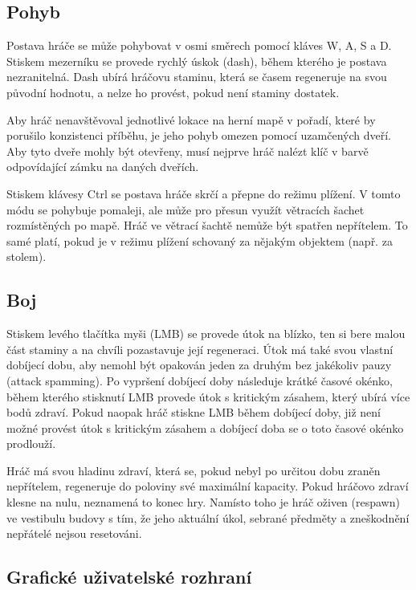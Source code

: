 \documentclass[FM,Proj]{tulthesis}
\begin{document}
	\subsection{Pohyb} %
	
	Postava hráče se může pohybovat v osmi směrech pomocí kláves W, A, S a D. Stiskem mezerníku se provede rychlý úskok (dash), během kterého je postava nezranitelná. Dash ubírá hráčovu staminu, která se časem regeneruje na svou původní hodnotu, a nelze ho provést, pokud není staminy dostatek.
	
	Aby hráč nenavštěvoval jednotlivé lokace na herní mapě v pořadí, které by porušilo konzistenci příběhu, je jeho pohyb omezen pomocí uzamčených dveří. Aby tyto dveře mohly být otevřeny, musí nejprve hráč nalézt klíč v barvě odpovídající zámku na daných dveřích.
	
	Stiskem klávesy Ctrl se postava hráče skrčí a přepne do režimu plížení. V tomto módu se pohybuje pomaleji, ale může pro přesun využít větracích šachet rozmístěných po mapě. Hráč ve větrací šachtě nemůže být spatřen nepřítelem. To samé platí, pokud je v režimu plížení schovaný za nějakým objektem (např. za stolem).
	
	\subsection{Boj} %
	
	Stiskem levého tlačítka myši (LMB) se provede útok na blízko, ten si bere malou část staminy a na chvíli pozastavuje její regeneraci. Útok má také svou vlastní dobíjecí dobu, aby nemohl být opakován jeden za druhým bez jakékoliv pauzy (attack spamming). Po vypršení dobíjecí doby následuje krátké časové okénko, během kterého stisknutí LMB provede útok s kritickým zásahem, který ubírá více bodů zdraví. Pokud naopak hráč stiskne LMB během dobíjecí doby, již není možné provést útok s kritickým zásahem a dobíjecí doba se o toto časové okénko prodlouží.
	
	Hráč má svou hladinu zdraví, která se, pokud nebyl po určitou dobu zraněn nepřítelem, regeneruje do poloviny své maximální kapacity. Pokud hráčovo zdraví klesne na nulu, neznamená to konec hry. Namísto toho je hráč oživen (respawn) ve vestibulu budovy s tím, že jeho aktuální úkol, sebrané předměty a zneškodnění nepřátelé nejsou resetováni.
		
	\subsection{Grafické uživatelské rozhraní} %
	
\end{document}
